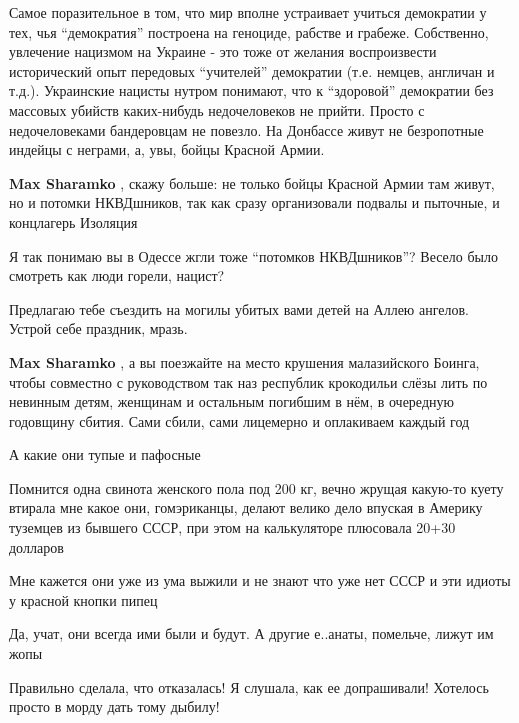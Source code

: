 \begin{itemize}

Самое поразительное в том, что мир вполне устраивает учиться демократии у тех,
чья \enquote{демократия} построена на геноциде, рабстве и грабеже. Собственно,
увлечение нацизмом на Украине - это тоже от желания воспроизвести исторический
опыт передовых \enquote{учителей} демократии (т.е. немцев, англичан и т.д.). Украинские
нацисты нутром понимают, что к \enquote{здоровой} демократии без массовых убийств
каких-нибудь недочеловеков не прийти. Просто с недочеловеками бандеровцам не
повезло. На Донбассе живут не безропотные индейцы с неграми, а, увы, бойцы
Красной Армии.

\begin{itemize} %
\textbf{Max Sharamko} , скажу больше: не только бойцы Красной Армии там живут, но и потомки НКВДшников, так как сразу организовали подвалы и пыточные, и концлагерь Изоляция

Я так понимаю вы в Одессе жгли тоже \enquote{потомков НКВДшников}? Весело было смотреть как люди горели, нацист?

Предлагаю тебе съездить на могилы убитых вами детей на Аллею ангелов. Устрой себе праздник, мразь.

\textbf{Max Sharamko} , а вы поезжайте на место крушения малазийского Боинга, чтобы совместно с руководством так наз республик крокодильи слёзы лить по невинным детям, женщинам и остальным погибшим в нём, в очередную годовщину сбития. Сами сбили, сами лицемерно и оплакиваем каждый год
\end{itemize} %

А какие они тупые и пафосные

Помнится одна свинота женского пола под 200 кг, вечно жрущая какую-то куету
втирала мне какое они, гомэриканцы, делают велико дело впуская в Америку
туземцев из бывшего СССР, при этом на калькуляторе плюсовала 20+30 долларов


Мне кажется они уже из ума выжили и не знают что уже нет СССР и эти идиоты у красной кнопки пипец

Да, учат, они всегда ими были и будут. А другие е..анаты, помельче, лижут им жопы

Правильно сделала, что отказалась! Я слушала, как ее допрашивали! Хотелось просто в морду дать тому дыбилу!
\end{itemize} %
